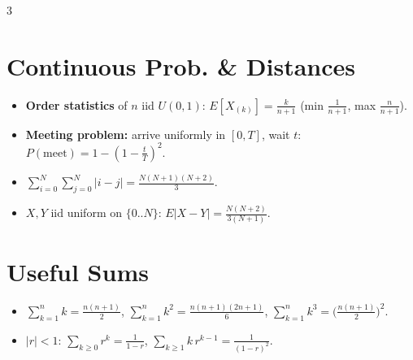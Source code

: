 \documentclass[10pt]{article}
\newenvironment{notes}{\footnotesize\begin{itemize}}{\end{itemize}}
\begin{document}
\begin{multicols*}{3}
\section{Continuous Prob. \& Distances}
\begin{notes}
\item \textbf{Order statistics} of $n$ iid $U(0,1)$: $E[X_{(k)}]=\frac{k}{n+1}$ (min $\frac1{n+1}$, max $\frac n{n+1}$).
\item \textbf{Meeting problem:} arrive uniformly in $[0,T]$, wait $t$: $P(\text{meet})=1-(1-\frac tT)^2$.
\item $\sum_{i=0}^{N}\sum_{j=0}^{N}|i-j|=\frac{N(N+1)(N+2)}{3}$.
\item $X,Y$ iid uniform on $\{0..N\}$: $E|X-Y|=\frac{N(N+2)}{3(N+1)}$.
\end{notes}

\section{Useful Sums}
\begin{notes}
\item $\sum_{k=1}^{n}k=\frac{n(n+1)}2$, \quad $\sum_{k=1}^{n}k^2=\frac{n(n+1)(2n+1)}6$, \quad $\sum_{k=1}^{n}k^3=\big(\frac{n(n+1)}2\big)^2$.
\item $|r|<1$: $\sum_{k\ge0}r^k=\frac1{1-r}$, \quad $\sum_{k\ge1}k\,r^{k-1}=\frac1{(1-r)^2}$.
\end{notes}

\end{multicols*}
\end{document}
